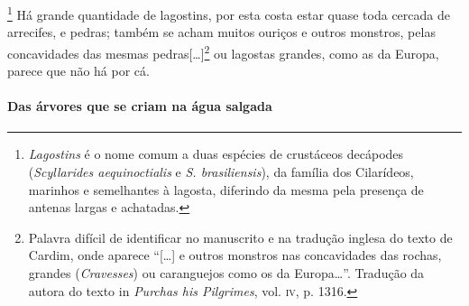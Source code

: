 \footnote{ \textit{Lagostins} é o nome comum a
duas espécies de crustáceos decápodes (\textit{Scyllarides
aequinoctialis} e \textit{S. brasiliensis}), da família dos Cilarídeos,
marinhos e semelhantes à lagosta, diferindo da mesma pela presença de
antenas largas e achatadas.} Há grande quantidade de
lagostins, por esta costa estar quase toda cercada de arrecifes, e
pedras; também se acham muitos ouriços e outros monstros, pelas
concavidades das mesmas pedras[\ldots{}]\footnote{ Palavra difícil de
identificar no manuscrito e na tradução inglesa do texto de Cardim,
onde aparece ``[\ldots{}] e outros monstros nas concavidades das rochas,
grandes (\textit{Cravesses}) ou caranguejos como os da Europa\ldots{}''.
Tradução da autora do texto in \textit{Purchas his Pilgrimes}, vol. \textsc{iv},
p. 1316.} ou lagostas grandes, como as da Europa, parece que não há por cá.


\paragraph{Das árvores que se criam na água salgada}

